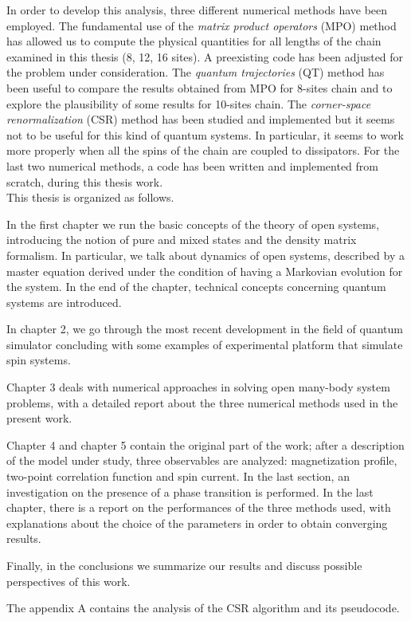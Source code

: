 In order to develop this analysis, three different numerical methods have been employed.  The fundamental use of the \emph{matrix product operators} (MPO) method has allowed us to compute the physical quantities for all lengths of the chain examined in this thesis (8, 12, 16 sites). A preexisting code has been adjusted for the problem under consideration. The \emph{quantum trajectories} (QT) method has been useful to compare the results obtained from MPO for 8-sites chain and to explore the plausibility of some results for 10-sites chain. The \emph{corner-space renormalization} (CSR) method has been studied and implemented but it seems not to be useful for this kind of quantum systems. In particular, it seems to work more properly when all the spins of the chain are coupled to dissipators. For the last two numerical methods, a code has been written and implemented from scratch, during this thesis work.
\\


This thesis is organized as follows. 

In the first chapter we run the basic concepts of the theory of open systems, introducing the notion of pure and mixed states and the density matrix formalism. In particular, we talk about dynamics of open systems, described by a master equation derived under the condition of having a Markovian evolution for the system. In the end of the chapter, technical concepts concerning quantum systems are introduced. 

In chapter 2, we go through the most recent development in the field of quantum simulator concluding with some examples of experimental platform that simulate spin systems. 

Chapter 3 deals with numerical approaches in solving open many-body system problems, with a detailed report about the three numerical methods used in the present work. 

Chapter 4 and chapter 5 contain the original part of the work; after a description of the model under study, three observables are analyzed: magnetization profile, two-point correlation function and spin current. In the last section, an investigation on the presence of a phase transition is performed. In the last chapter, there is a report on the performances of the three methods used, with explanations about the choice of the parameters in order to obtain converging results.

Finally, in the conclusions we summarize our results and discuss possible perspectives of this work.

The appendix A contains the analysis of the CSR algorithm and its pseudocode.